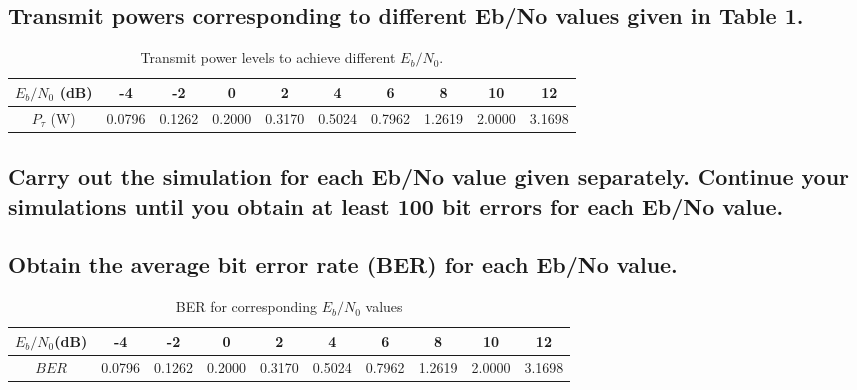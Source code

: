 \documentclass[11pt]{article}
\newcommand{\snr}{$E_{b}/N_{0}$}
\begin{document}



\subsection{Transmit powers corresponding to different Eb/No values given in Table 1.}

\begin{table}[h]
\centering
\caption{\label{tab:transmit_power_levels}Transmit power levels to achieve different $E_{b}/N_{0}$.}
\begin{tabular}{|c|c|c|c|c|c|c|c|c|c|}

\hline
$E_{b}/N_{0}$ (dB) & -4 & -2 & 0 & 2 & 4 & 6 & 8 & 10 & 12 \\\hline
$P_{\tau}$ (W) & 0.0796 & 0.1262 & 0.2000 & 0.3170 & 0.5024 &	0.7962 &	1.2619	& 2.0000 & 3.1698 \\\hline             %

\end{tabular}

\end{table}

\subsection{Carry out the simulation for each Eb/No value given separately. Continue your simulations until you obtain at least 100 bit errors for each Eb/No value.}
\subsection{Obtain the average bit error rate (BER) for each Eb/No value.}



\begin{table}[h]
\centering
\caption{BER for corresponding $E_{b}/N_{0}$ values}
\begin{tabular}{|c|c|c|c|c|c|c|c|c|c|}

\hline
\snr (dB) & -4     &     -2 &      0 &      2 &      4 &         6 &          8 &     10 &     12 \\\hline
$BER$     & 0.0796 & 0.1262 & 0.2000 & 0.3170 & 0.5024 &	0.7962 &	1.2619	& 2.0000 & 3.1698 \\\hline

\end{tabular}

\end{table}
\end{document}
